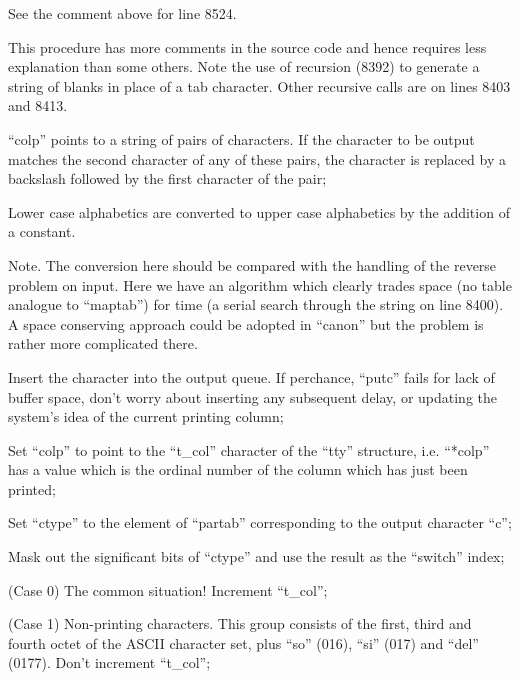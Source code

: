 
See the comment above for line 8524.


This procedure has more comments in the
source code and hence requires less
explanation than some others. Note the
use of recursion (8392) to generate a
string of blanks in place of a tab
character. Other recursive calls are
on lines 8403 and 8413.


\bd
\item[8400:] ``colp'' points to a string of
pairs of characters. If the character to be output matches the
second character of any of these
pairs, the character is replaced
by a backslash followed by the first character of the pair;

\item[8407:] Lower case alphabetics are converted to upper case alphabetics
by the addition of a constant.
\ed

\noindent Note. The conversion here should be
compared with the handling of the
reverse problem on input. Here we have
an algorithm which clearly trades space
(no table analogue to ``maptab'') for
time (a serial search through the
string on line 8400). A space conserving
approach could be adopted in
``canon'' but the problem is rather more
complicated there.

\bd
\item[8414:] Insert the character into the
output queue. If perchance,
``putc'' fails for lack of buffer
space, don't worry about inserting any subsequent delay, or
updating the system's idea of the
current printing column;

\item[8423:] Set ``colp'' to point to the
``t\_col'' character of the ``tty''
structure, i.e. ``*colp'' has a
value which is the ordinal number
of the column which has just been
printed;

\item[8424:] Set ``ctype'' to the element of
``partab'' corresponding to the
output character ``c'';


\item[8426:] Mask out the significant bits of
``ctype'' and use the result as the
``switch'' index;

\item[8428:] (Case 0) The common situation!
Increment ``t\_col'';

\item[8431:] (Case 1) Non-printing characters.
This group consists of the first,
third and fourth octet of the
ASCII character set, plus ``so''
(016), ``si'' (017) and ``del''
(0177). Don't increment ``t\_col'';


